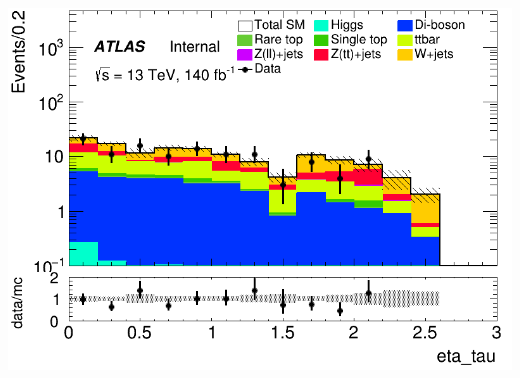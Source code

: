 \documentclass[usenames,dvipsnames]{beamer}
\begin{document}
\begin{frame}
\begin{minipage}{0.32\textwidth}
        \includegraphics[width=\textwidth]{graphics/LHH_met/LHH_met_eta_tau.png}
    \end{minipage}
\end{frame}
\end{document}

